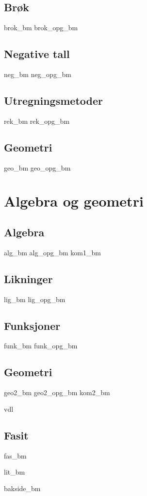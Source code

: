\chapter{Brøk \label{Brok}} 
\newpage
{brok_bm}
\newpage
{brok_opg_bm}

\chapter{Negative tall \label{Negtal}}
\newpage
{neg_bm}
{neg_opg_bm}

\chapter{Utregningsmetoder \label{Utrekning}}
\newpage
{rek_bm}
\newpage
{rek_opg_bm}

\chapter{Geometri \label{Geometri}}
\newpage
{geo_bm}
{geo_opg_bm}

\part{Algebra og geometri \label{Del2}}
\chapter{Algebra \label{Algebra}}
\newpage
{alg_bm}
{alg_opg_bm}
\newpage
{kom1_bm}

\chapter{Likninger \label{Likningar}}
\newpage
{lig_bm}
{lig_opg_bm}

\chapter{Funksjoner \label{Funksjoner}}
{funk_bm}
{funk_opg_bm}

\chapter{Geometri \label{Geometri2}}
\newpage
{geo2_bm}
{geo2_opg_bm}
\newpage
{kom2_bm}

{vdl}

\newpage
{}
{}
\chapter*{Fasit}
{fas_bm}

{lit_bm}
{\printindex {}
	}
{bakside_bm}









